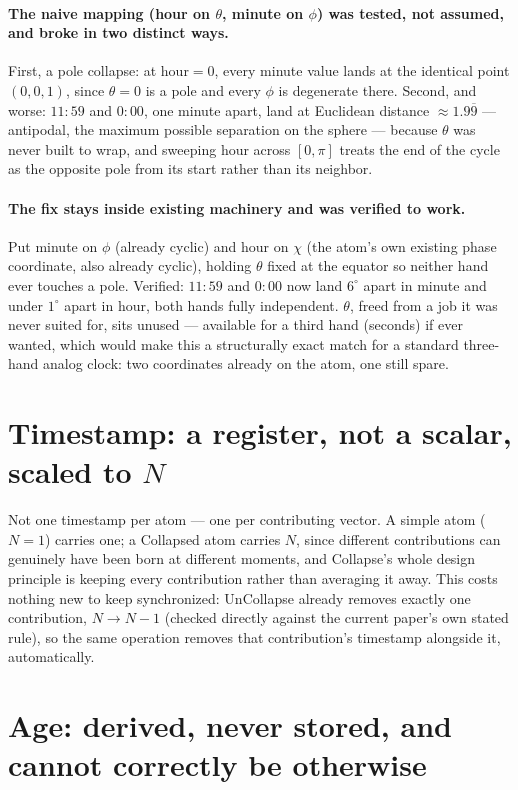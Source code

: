 \documentclass[11pt]{article}
\begin{document}
\paragraph{The naive mapping (hour on $\theta$, minute on $\phi$)
was tested, not assumed, and broke in two distinct ways.} First, a
pole collapse: at hour$=0$, every minute value lands at the
identical point $(0,0,1)$, since $\theta=0$ is a pole and every
$\phi$ is degenerate there. Second, and worse: $11\!:\!59$ and
$0\!:\!00$, one minute apart, land at Euclidean distance
$\approx1.9\overline{9}$ --- antipodal, the maximum possible
separation on the sphere --- because $\theta$ was never built to
wrap, and sweeping hour across $[0,\pi]$ treats the end of the cycle
as the opposite pole from its start rather than its neighbor.

\paragraph{The fix stays inside existing machinery and was verified
to work.} Put minute on $\phi$ (already cyclic) and hour on $\chi$
(the atom's own existing phase coordinate, also already cyclic),
holding $\theta$ fixed at the equator so neither hand ever touches a
pole. Verified: $11\!:\!59$ and $0\!:\!00$ now land $6^\circ$ apart
in minute and under $1^\circ$ apart in hour, both hands fully
independent. $\theta$, freed from a job it was never suited for, sits
unused --- available for a third hand (seconds) if ever wanted, which
would make this a structurally exact match for a standard three-hand
analog clock: two coordinates already on the atom, one still spare.

\section{Timestamp: a register, not a scalar, scaled to $N$}

Not one timestamp per atom --- one per contributing vector. A simple
atom ($N=1$) carries one; a Collapsed atom carries $N$, since
different contributions can genuinely have been born at different
moments, and Collapse's whole design principle is keeping every
contribution rather than averaging it away. This costs nothing new
to keep synchronized: UnCollapse already removes exactly one
contribution, $N\to N-1$ (checked directly against the current
paper's own stated rule), so the same operation removes that
contribution's timestamp alongside it, automatically.

\section{Age: derived, never stored, and cannot correctly be
otherwise}
\end{document}
